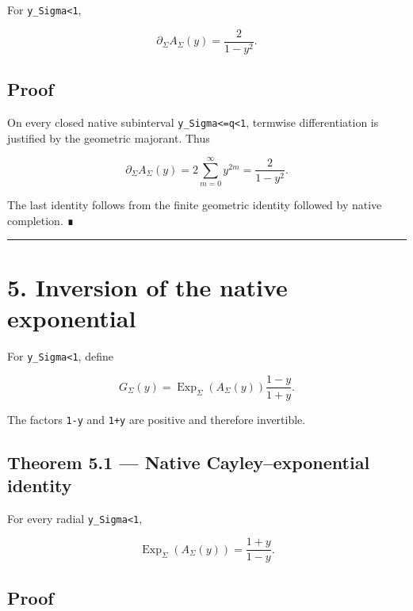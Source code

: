 For \texttt{\textbar{}y\textbar{}\_Sigma\textless{}1},

\[
\boxed{
\partial_\Sigma A_\Sigma(y)
=
\frac{2}{1-y^2}.
}
\]

\hypertarget{proof-5}{%
\subsection{Proof}\label{proof-5}}

On every closed native subinterval \texttt{\textbar{}y\textbar{}\_Sigma\textless{}=q\textless{}1}, termwise differentiation
is justified by the geometric majorant. Thus

\[
\partial_\Sigma A_\Sigma(y)
=
2\sum_{m=0}^{\infty}y^{2m}
=
\frac{2}{1-y^2}.
\]

The last identity follows from the finite geometric identity followed by native
completion. ∎

\begin{center}\rule{0.5\linewidth}{0.5pt}\end{center}

\hypertarget{inversion-of-the-native-exponential}{%
\section{5. Inversion of the native exponential}\label{inversion-of-the-native-exponential}}

For \texttt{\textbar{}y\textbar{}\_Sigma\textless{}1}, define

\[
G_\Sigma(y)
=
\operatorname{Exp}_\Sigma(A_\Sigma(y))
\frac{1-y}{1+y}.
\]

The factors \texttt{1-y} and \texttt{1+y} are positive and therefore invertible.

\hypertarget{theorem-5.1-native-cayleyexponential-identity}{%
\subsection{Theorem 5.1 --- Native Cayley--exponential identity}\label{theorem-5.1-native-cayleyexponential-identity}}

For every radial \texttt{\textbar{}y\textbar{}\_Sigma\textless{}1},

\[
\boxed{
\operatorname{Exp}_\Sigma(A_\Sigma(y))
=
\frac{1+y}{1-y}.
}
\]

\hypertarget{proof-6}{%
\subsection{Proof}\label{proof-6}}

